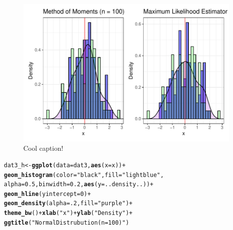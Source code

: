 \documentclass{article}\usepackage[]{graphicx}\usepackage[]{color}
\makeatletter
\def\maxwidth{ %
  \ifdim\Gin@nat@width>\linewidth
    \linewidth
  \else
    \Gin@nat@width
  \fi
}
\newcommand{\hlnum}[1]{\textcolor[rgb]{0.686,0.059,0.569}{#1}}%
\newcommand{\hlstr}[1]{\textcolor[rgb]{0.192,0.494,0.8}{#1}}%
\newcommand{\hlopt}[1]{\textcolor[rgb]{0,0,0}{#1}}%
\newcommand{\hlstd}[1]{\textcolor[rgb]{0.345,0.345,0.345}{#1}}%
\newcommand{\hlkwb}[1]{\textcolor[rgb]{0.69,0.353,0.396}{#1}}%
\newcommand{\hlkwc}[1]{\textcolor[rgb]{0.333,0.667,0.333}{#1}}%
\newcommand{\hlkwd}[1]{\textcolor[rgb]{0.737,0.353,0.396}{\textbf{#1}}}%
\newenvironment{kframe}{%
 \def\at@end@of@kframe{}%
 \ifinner\ifhmode%
  \def\at@end@of@kframe{\end{minipage}}%
  \begin{minipage}{\columnwidth}%
 \fi\fi%
 \def\FrameCommand##1{\hskip\@totalleftmargin \hskip-\fboxsep
 \colorbox{shadecolor}{##1}\hskip-\fboxsep
     \hskip-\linewidth \hskip-\@totalleftmargin \hskip\columnwidth}%
 \MakeFramed {\advance\hsize-\width
   \@totalleftmargin\z@ \linewidth\hsize
   \@setminipage}}%
 {\par\unskip\endMakeFramed%
 \at@end@of@kframe}
\newenvironment{knitrout}{}{} %
\makeatother
\begin{document}
\begin{enumerate}
\begin{enumerate}
  \begin{figure}[H]
\begin{center}
\begin{knitrout}
\color{fgcolor}
\includegraphics[width=\maxwidth]{figure/unnamed-chunk-32-1} 
\end{knitrout}
	\caption{Cool caption!}
\label{p2plot5} %
\end{center}
\end{figure}
  
\begin{knitrout}
\color{fgcolor}\begin{kframe}
\begin{alltt}
\hlstd{dat3_h} \hlkwb{<-} \hlkwd{ggplot}\hlstd{(}\hlkwc{data}\hlstd{=dat3,} \hlkwd{aes}\hlstd{(}\hlkwc{x}\hlstd{=x))}\hlopt{+}
  \hlkwd{geom_histogram}\hlstd{(}\hlkwc{color}\hlstd{=}\hlstr{"black"}\hlstd{,} \hlkwc{fill} \hlstd{=} \hlstr{"lightblue"}\hlstd{,}
                 \hlkwc{alpha} \hlstd{=} \hlnum{0.5}\hlstd{,} \hlkwc{binwidth} \hlstd{=} \hlnum{0.2}\hlstd{,} \hlkwd{aes}\hlstd{(}\hlkwc{y}\hlstd{=..density..))}\hlopt{+}
  \hlkwd{geom_hline}\hlstd{(}\hlkwc{yintercept}\hlstd{=}\hlnum{0}\hlstd{)}\hlopt{+}
  \hlkwd{geom_density}\hlstd{(}\hlkwc{alpha}\hlstd{=}\hlnum{.2}\hlstd{,} \hlkwc{fill}\hlstd{=}\hlstr{"purple"}\hlstd{)} \hlopt{+}
  \hlkwd{theme_bw}\hlstd{()}\hlopt{+} \hlkwd{xlab}\hlstd{(}\hlstr{"x"}\hlstd{)}\hlopt{+} \hlkwd{ylab}\hlstd{(}\hlstr{"Density"}\hlstd{)}\hlopt{+}
  \hlkwd{ggtitle}\hlstd{(}\hlstr{"Normal Distrubution (n = 100)"}\hlstd{)}


\end{alltt}
\end{kframe}
\end{knitrout}
\end{enumerate}
\end{enumerate}
\end{document}
